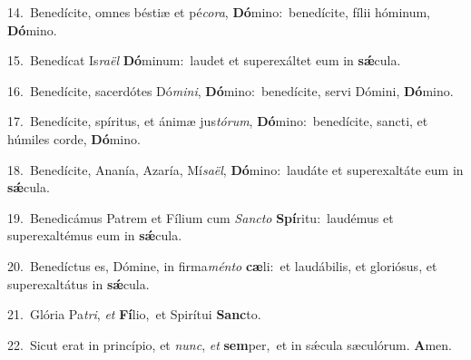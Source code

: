 {\numbfont\textcolor{\numbcolor}{14.}}~Benedícite, omnes béstiæ et pé\-\textit{co}\-\textit{ra}, \textbf{Dó}\-mino:~\star benedícite, fílii hóminum, \textbf{Dó}\-mino.\par
{\numbfont\textcolor{\numbcolor}{15.}}~Benedícat Is\-\textit{ra}\-\textit{ël} \textbf{Dó}\-minum:~\star laudet et superexáltet eum in \textbf{sǽ}\-cula.\par
{\numbfont\textcolor{\numbcolor}{16.}}~Benedícite, sacerdótes Dó\-\textit{mi}\-\textit{ni}, \textbf{Dó}\-mino:~\star benedícite, servi Dómini, \textbf{Dó}\-mino.\par
{\numbfont\textcolor{\numbcolor}{17.}}~Benedícite, spíritus, et ánimæ jus\-\textit{tó}\-\textit{rum}, \textbf{Dó}\-mino:~\star benedícite, sancti, et húmiles corde, \textbf{Dó}\-mino.\par
{\numbfont\textcolor{\numbcolor}{18.}}~Benedícite, Ananía, Azaría, Mí\-\textit{sa}\-\textit{ël}, \textbf{Dó}\-mino:~\star laudáte et superexaltáte eum in \textbf{sǽ}\-cula.\par
{\numbfont\textcolor{\numbcolor}{19.}}~Benedicámus Patrem et Fílium cum \textit{Sanc}\-\textit{to} \textbf{Spí}\-ritu:~\star laudémus et superexaltémus eum in \textbf{sǽ}\-cula.\par
{\numbfont\textcolor{\numbcolor}{20.}}~Benedíctus es, Dómine, in firma\-\textit{mén}\-\textit{to} \textbf{cæ}\-li:~\star et laudábilis, et gloriósus, et superexaltátus in \textbf{sǽ}\-cula.\par
{\numbfont\textcolor{\numbcolor}{21.}}~Glória Pa\-\textit{tri}\-, \textit{et} \textbf{Fí}\-lio,~\star et Spirítui \textbf{Sanc}\-to.\par
{\numbfont\textcolor{\numbcolor}{22.}}~Sicut erat in princípio, et \textit{nunc}\-, \textit{et} \textbf{sem}\-per,~\star et in sǽcula sæculórum. \textbf{A}\-men.\par
